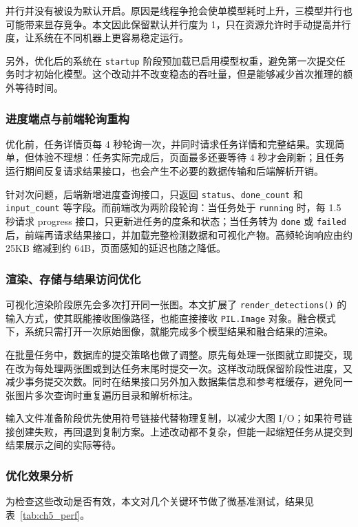 并行并没有被设为默认开启。原因是线程争抢会使单模型耗时上升，三模型并行也可能带来显存竞争。本文因此保留默认并行度为 1，只在资源允许时手动提高并行度，让系统在不同机器上更容易稳定运行。

另外，优化后的系统在 \texttt{startup} 阶段预加载已启用模型权重，避免第一次提交任务时才初始化模型。这个改动并不改变稳态的吞吐量，但是能够减少首次推理的额外等待时间。

\subsubsection{进度端点与前端轮询重构}

优化前，任务详情页每 4 秒轮询一次，并同时请求任务详情和完整结果。实现简单，但体验不理想：任务实际完成后，页面最多还要等待 4 秒才会刷新；且任务运行期间反复请求结果接口，也会产生不必要的数据传输和后端解析开销。

针对次问题，后端新增进度查询接口，只返回 \texttt{status}、\texttt{done\_count} 和 \texttt{input\_count} 等字段。而前端改为两阶段轮询：当任务处于 \texttt{running} 时，每 1.5 秒请求 progress 接口，只更新进任务的度条和状态；当任务转为 \texttt{done} 或 \texttt{failed} 后，前端再请求结果接口，并加载完整检测数据和可视化产物。高频轮询响应由约 25KB 缩减到约 64B，页面感知的延迟也随之降低。

\subsubsection{渲染、存储与结果访问优化}

可视化渲染阶段原先会多次打开同一张图。本文扩展了 \texttt{render\_detections()} 的输入方式，使其既能接收图像路径，也能直接接收 \texttt{PIL.Image} 对象。融合模式下，系统只需打开一次原始图像，就能完成多个模型结果和融合结果的渲染。

在批量任务中，数据库的提交策略也做了调整。原先每处理一张图就立即提交，现在改为每处理两张图或到达任务末尾时提交一次。这样改动既保留阶段性进度，又减少事务提交次数。同时在结果接口另外加入数据集信息和参考框缓存，避免同一张图片多次查询时重复遍历目录和解析标注。

输入文件准备阶段优先使用符号链接代替物理复制，以减少大图 I/O；如果符号链接创建失败，再回退到复制方案。上述改动都不复杂，但能一起缩短任务从提交到结果展示之间的实际等待。

\subsubsection{优化效果分析}

为检查这些改动是否有效，本文对几个关键环节做了微基准测试，结果见表~\ref{tab:ch5_perf}。

